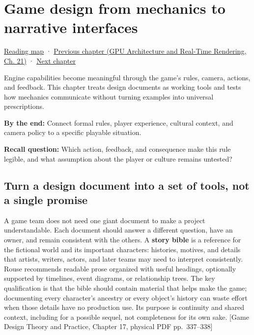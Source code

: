 \chapter{Game design from mechanics to narrative interfaces}\label{06-engine-ii-ch046-game-design-from-mechanics-to-narrative-interfaces}\hypertarget{06-engine-ii-ch046}{}\label{stagechapter:06-engine-ii-ch046}

\hypertarget{06-engine-ii-ch046-game-design-from-mechanics-to-narrative-interfaces}{}

\hyperref[volume-reading-map]{Reading map} · \href{../06-GPU-Architecture-and-Real-Time-Rendering/main.pdf\#nameddest=06-engine-ii-ch045-rasterizing-kernels-and-connecting-world-identity}{Previous chapter (GPU Architecture and Real-Time Rendering, Ch. 21)} · \hyperref[06-engine-ii-ch047-narrative-simulation-and-ai-in-playable-worlds]{Next chapter}

Engine capabilities become meaningful through the game's rules, camera, actions, and feedback. This chapter treats design documents as working tools and tests how mechanics communicate without turning examples into universal prescriptions.

\textbf{By the end:} Connect formal rules, player experience, cultural context, and camera policy to a specific playable situation.

\textbf{Recall question:} Which action, feedback, and consequence make this rule legible, and what assumption about the player or culture remains untested?

\section{Turn a design document into a set of tools, not a single promise}\label{06-engine-ii-ch046-turn-a-design-document-into-a-set-of-tools-not-a-single-promise}

\hypertarget{06-engine-ii-ch046-turn-a-design-document-into-a-set-of-tools-not-a-single-promise}{}

A game team does not need one giant document to make a project understandable. Each document should answer a different question, have an owner, and remain consistent with the others. A \textbf{story bible} is a reference for the fictional world and its important characters: histories, motives, and details that artists, writers, actors, and later teams may need to interpret consistently. Rouse recommends readable prose organized with useful headings, optionally supported by timelines, event diagrams, or relationship trees. The key qualification is that the bible should contain material that helps make the game; documenting every character's ancestry or every object's history can waste effort when those details have no production use. Its purpose is continuity and shared context, including for a possible sequel, not completeness for its own sake. {[}Game Design Theory and Practice, Chapter 17, physical PDF pp.~337--338{]}

